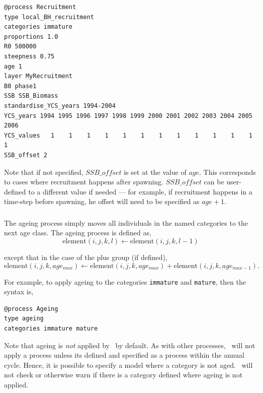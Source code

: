 {\small{\begin{verbatim}
@process Recruitment
type local_BH_recruitment
categories immature
proportions 1.0
R0 500000
steepness 0.75
age 1
layer MyRecruitment
B0 phase1
SSB SSB_Biomass
standardise_YCS_years 1994-2004
YCS_years 1994 1995 1996 1997 1998 1999 2000 2001 2002 2003 2004 2005 2006
YCS_values   1    1    1    1    1    1    1    1    1    1    1    1    1
SSB_offset 2
\end{verbatim}}}

Note that if not specified, $SSB\_offset$ is set at the value of $age$. This corresponds to cases where recruitment happens after spawning. $SSB\_offset$ can be user-defined to a different value if needed --- for example, if recruitment happens in a time-step before spawning, he offset will need to be specified as $age + 1$.

\subsubsection{\label{sec:ageing}}

The ageing process simply moves all individuals in the named categories to the next age class. The ageing process is defined as,
\begin{equation}
  \text{element}(i,j,k,l) \leftarrow \text{element}(i,j,k,l-1)
\end{equation}

except that in the case of the plus group (if defined), 
\begin{equation}
  \text{element}(i,j,k,age_{max}) \leftarrow \text{element}(i,j,k,age_{max}) + \text{element}(i,j,k,age_{max-1}).
\end{equation}

For example, to apply ageing to the categories \texttt{immature} and \texttt{mature}, then the syntax is,

{\small{\begin{verbatim}
@process Ageing
type ageing
categories immature mature
\end{verbatim}}}

Note that ageing is \emph{not} applied by \SPM\ by default. As with other processes, \SPM\ will not apply a process unless its defined and specified as a process within the annual cycle. Hence, it is possible to specify a model where a category is not aged. \SPM\ will not check or otherwise warn if there is a category defined where ageing is not applied.

\subsubsection{\label{sec:mortality}}

